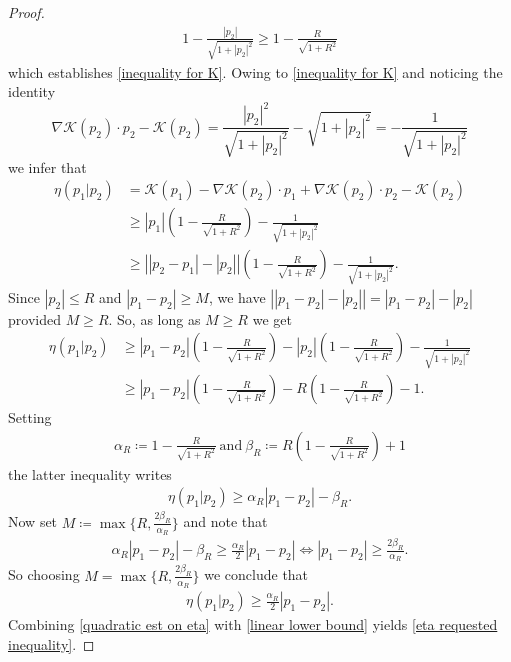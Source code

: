 \documentclass[10pt,a4paper]{amsart}
\begin{document}
\begin{proof}
\begin{align*}
1-\frac{\left\vert p_{2}\right\vert}{\sqrt{1+\left\vert p_{2}\right\vert^{2}}}\geq 1-\frac{R}{\sqrt{1+R^{2}}}    
\end{align*}
which establishes \eqref{inequality for K}. 
Owing to \eqref{inequality for K} and noticing the identity 
$$\nabla \mathscr{K}(p_{2})\cdot p_{2}-\mathscr{K}(p_{2})=\frac{\left\vert p_{2}\right\vert^{2} }{\sqrt{1+\left\vert p_{2}\right\vert^{2} }}-\sqrt{1+\left\vert p_{2} \right\vert^{2} }=-\frac{1}{\sqrt{1+\left\vert p_{2}\right\vert^{2}}}$$we infer that 
\begin{align*}
\eta(p_{1}\vert p_{2})&=
\mathscr{K}(p_{1})-\nabla \mathscr{K}(p_{2})\cdot p_{1}+\nabla \mathscr{K}(p_{2})\cdot p_{2}-\mathscr{K}(p_{2})\\
&\geq \left\vert p_{1}\right\vert\left(1-\frac{R}{\sqrt{1+R^{2}}}\right)-\frac{1}{\sqrt{1+\left\vert p_{2}\right\vert^{2}}}\\
&\geq \left\vert \left\vert p_{2}-p_{1}\right\vert-\left\vert p_{2}\right\vert\right\vert\left(1-\frac{R}{\sqrt{1+R^{2}}}\right)-\frac{1}{\sqrt{1+\left\vert p_{2}\right\vert^{2}}}. \end{align*}
Since $\left\vert p_{2}\right\vert\leq R $ and $\left\vert p_{1}-p_{2}\right\vert\geq M$, we have $\left\vert \left\vert p_{1}-p_{2}\right\vert -\left\vert p_{2}\right\vert \right\vert=\left\vert p_{1}-p_{2}\right\vert  -\left\vert p_{2}\right\vert $ provided $M\geq R$.  So, as long as $M\geq R$ we get 
\begin{align*}
\eta(p_{1}\vert p_{2})&\geq \left\vert p_{1}-p_{2}\right\vert\left(1-\frac{R}{\sqrt{1+R^{2}}}\right)-\left\vert p_{2}\right\vert\left(1-\frac{R}{\sqrt{1+R^{2}}}\right)-\frac{1}{\sqrt{1+\left\vert p_{2}\right\vert^{2}}}\\
&\geq \left\vert p_{1}-p_{2}\right\vert\left(1-\frac{R}{\sqrt{1+R^{2}}}\right)-R\left(1-\frac{R}{\sqrt{1+R^{2}}}\right)-1. 
\end{align*}
Setting 
\begin{align*}
\alpha_{R}\coloneqq 1-\frac{R}{\sqrt{1+R^{2}}}\ \mbox{and}\ \beta_{R}\coloneqq R\left(1-\frac{R}{\sqrt{1+R^{2}}}\right)+1    
\end{align*}
the latter inequality writes 
\begin{align*}
\eta(p_{1}\vert p_{2})\geq \alpha_{R}\left\vert p_{1}-p_{2}\right\vert-\beta_{R}.      
\end{align*}
Now set $M\coloneqq \max\{R,\frac{2\beta_{R}}{\alpha_{R}}\}$ and note that 
\begin{align*}
\alpha_{R}\left\vert p_{1}-p_{2}\right\vert-\beta_{R}\geq \frac{\alpha_{R}}{2}\left\vert p_{1}-p_{2}\right\vert\iff \left\vert p_{1}-p_{2}\right\vert\geq \frac{2\beta_{R}}{\alpha_{R}}.        
\end{align*}
So choosing  $M=\max\{R,\frac{2\beta_{R}}{\alpha_{R}}\}$ we conclude that 
\begin{align}
\eta(p_{1}\vert p_{2})\geq \frac{\alpha_{R}}{2}\left\vert p_{1}-p_{2}\right\vert. \label{linear lower bound}     
\end{align}
Combining \eqref{quadratic est on eta} with \eqref{linear lower bound} yields \eqref{eta requested inequality}. 
\end{proof}
\end{document}
